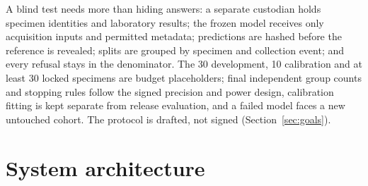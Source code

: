 \documentclass[10pt,a4paper,twocolumn]{article}
\begin{document}
A blind test needs more than hiding answers: a separate custodian holds specimen identities and laboratory results; the frozen model receives only acquisition inputs and permitted metadata; predictions are hashed before the reference is revealed; splits are grouped by specimen and collection event; and every refusal stays in the denominator. The 30 development, 10 calibration and at least 30 locked specimens are budget placeholders; final independent group counts and stopping rules follow the signed precision and power design, calibration fitting is kept separate from release evaluation, and a failed model faces a new untouched cohort. The protocol is drafted, not signed (Section~\ref{sec:goals}).

\section{System architecture}\label{sec:arch}
\end{document}

